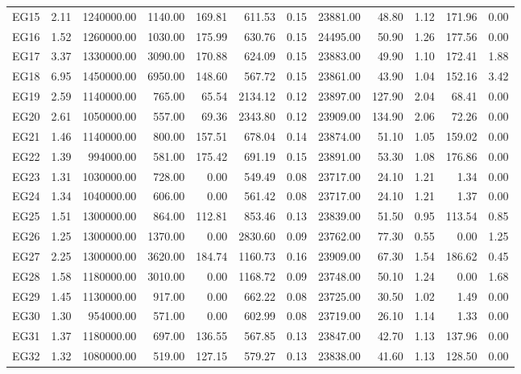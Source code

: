 \begin{tabular}{lrrrrrrrrrrr}
    EG15 & 2.11 & 1240000.00 & 1140.00 & 169.81 & 611.53 & 0.15 & 23881.00 & 48.80 & 1.12 & 171.96 & 0.00 \\
    EG16 & 1.52 & 1260000.00 & 1030.00 & 175.99 & 630.76 & 0.15 & 24495.00 & 50.90 & 1.26 & 177.56 & 0.00 \\
    EG17 & 3.37 & 1330000.00 & 3090.00 & 170.88 & 624.09 & 0.15 & 23883.00 & 49.90 & 1.10 & 172.41 & 1.88 \\
    EG18 & 6.95 & 1450000.00 & 6950.00 & 148.60 & 567.72 & 0.15 & 23861.00 & 43.90 & 1.04 & 152.16 & 3.42 \\
    EG19 & 2.59 & 1140000.00 & 765.00 & 65.54 & 2134.12 & 0.12 & 23897.00 & 127.90 & 2.04 & 68.41 & 0.00 \\
    EG20 & 2.61 & 1050000.00 & 557.00 & 69.36 & 2343.80 & 0.12 & 23909.00 & 134.90 & 2.06 & 72.26 & 0.00 \\
    EG21 & 1.46 & 1140000.00 & 800.00 & 157.51 & 678.04 & 0.14 & 23874.00 & 51.10 & 1.05 & 159.02 & 0.00 \\
    EG22 & 1.39 & 994000.00 & 581.00 & 175.42 & 691.19 & 0.15 & 23891.00 & 53.30 & 1.08 & 176.86 & 0.00 \\
    EG23 & 1.31 & 1030000.00 & 728.00 & 0.00 & 549.49 & 0.08 & 23717.00 & 24.10 & 1.21 & 1.34 & 0.00 \\
    EG24 & 1.34 & 1040000.00 & 606.00 & 0.00 & 561.42 & 0.08 & 23717.00 & 24.10 & 1.21 & 1.37 & 0.00 \\
    EG25 & 1.51 & 1300000.00 & 864.00 & 112.81 & 853.46 & 0.13 & 23839.00 & 51.50 & 0.95 & 113.54 & 0.85 \\
    EG26 & 1.25 & 1300000.00 & 1370.00 & 0.00 & 2830.60 & 0.09 & 23762.00 & 77.30 & 0.55 & 0.00 & 1.25 \\
    EG27 & 2.25 & 1300000.00 & 3620.00 & 184.74 & 1160.73 & 0.16 & 23909.00 & 67.30 & 1.54 & 186.62 & 0.45 \\
    EG28 & 1.58 & 1180000.00 & 3010.00 & 0.00 & 1168.72 & 0.09 & 23748.00 & 50.10 & 1.24 & 0.00 & 1.68 \\
    EG29 & 1.45 & 1130000.00 & 917.00 & 0.00 & 662.22 & 0.08 & 23725.00 & 30.50 & 1.02 & 1.49 & 0.00 \\
    EG30 & 1.30 & 954000.00 & 571.00 & 0.00 & 602.99 & 0.08 & 23719.00 & 26.10 & 1.14 & 1.33 & 0.00 \\
    EG31 & 1.37 & 1180000.00 & 697.00 & 136.55 & 567.85 & 0.13 & 23847.00 & 42.70 & 1.13 & 137.96 & 0.00 \\
    EG32 & 1.32 & 1080000.00 & 519.00 & 127.15 & 579.27 & 0.13 & 23838.00 & 41.60 & 1.13 & 128.50 & 0.00 \\

\end{tabular}
